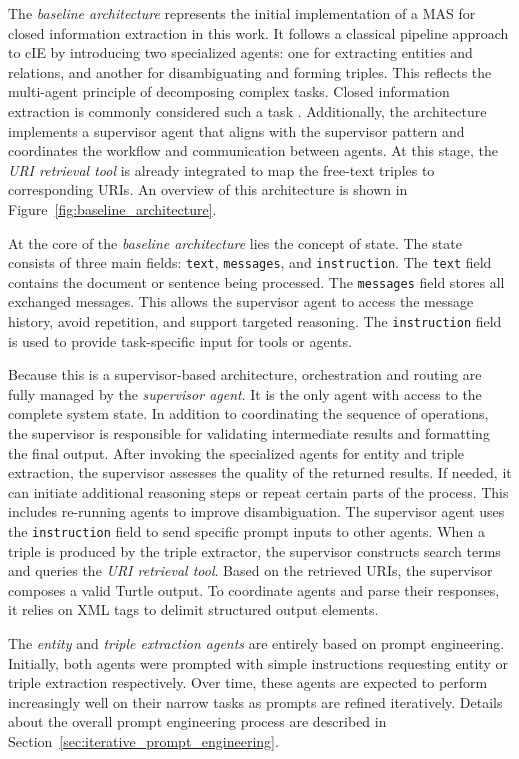 \documentclass[a4paper,oneside,bibliography=totoc]{scrbook}
\begin{document}
The \textit{baseline architecture} represents the initial implementation of a \ac{MAS} for closed information extraction in this work. It follows a classical pipeline approach to \ac{cIE} by introducing two specialized agents: one for extracting entities and relations, and another for disambiguating and forming triples. This reflects the multi-agent principle of decomposing complex tasks. Closed information extraction is commonly considered such a task \cite{Josifoski2021}. Additionally, the architecture implements a supervisor agent that aligns with the supervisor pattern and coordinates the workflow and communication between agents. At this stage, the \textit{URI retrieval tool} is already integrated to map the free-text triples to corresponding URIs. An overview of this architecture is shown in Figure~\ref{fig:baseline_architecture}.

At the core of the \textit{baseline architecture} lies the concept of state. The state consists of three main fields: \texttt{text}, \texttt{messages}, and \texttt{instruction}. The \texttt{text} field contains the document or sentence being processed. The \texttt{messages} field stores all exchanged messages. This allows the supervisor agent to access the message history, avoid repetition, and support targeted reasoning. The \texttt{instruction} field is used to provide task-specific input for tools or agents.

Because this is a supervisor-based architecture, orchestration and routing are fully managed by the \textit{supervisor agent}. It is the only agent with access to the complete system state. In addition to coordinating the sequence of operations, the supervisor is responsible for validating intermediate results and formatting the final output. After invoking the specialized agents for entity and triple extraction, the supervisor assesses the quality of the returned results. If needed, it can initiate additional reasoning steps or repeat certain parts of the process. This includes re-running agents to improve disambiguation. The supervisor agent uses the \texttt{instruction} field to send specific prompt inputs to other agents. When a triple is produced by the triple extractor, the supervisor constructs search terms and queries the \textit{URI retrieval tool}. Based on the retrieved URIs, the supervisor composes a valid Turtle output. To coordinate agents and parse their responses, it relies on XML tags to delimit structured output elements.

The \textit{entity} and \textit{triple extraction agents} are entirely based on prompt engineering. Initially, both agents were prompted with simple instructions requesting entity or triple extraction respectively. Over time, these agents are expected to perform increasingly well on their narrow tasks as prompts are refined iteratively. Details about the overall prompt engineering process are described in Section~\ref{sec:iterative_prompt_engineering}.
\end{document}
